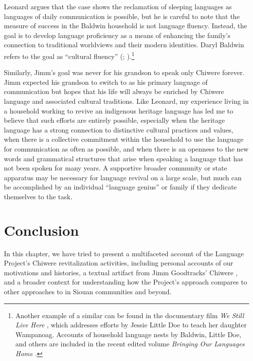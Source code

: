 \documentclass[output=paper]{LSP/langsci}
\begin{document}
\largerpage
Leonard argues that the  case shows the reclamation of sleeping languages as languages of daily communication is possible, but he is careful to note that the measure of success in the Baldwin household is not  language fluency. Instead, the goal is to develop language proficiency as a means of enhancing the family's connection to traditional worldviews and their modern  identities. Daryl Baldwin refers to the goal as ``cultural fluency'' (\citealt[36--37]{Leonard2007}; \citeyear[139--140]{Leonard2011}).\footnote{Another example of a similar  can be found in the documentary film \emph{We Still Live Here} \citep{Makepeace2011}, which addresses efforts by Jessie Little Doe to teach her daughter Wampanoag. Accounts of household language nests by Baldwin, Little Doe, and others are included in the recent edited volume \emph{Bringing Our Languages Home} \citep{Hinton2013}.} 

Similarly, Jimm's goal was never for his grandson to speak only Chiwere forever. Jimm expected his grandson to switch to  as his primary language of communication but hopes that his life will always be enriched by Chiwere language and associated cultural traditions. Like Leonard, my experience living in a household working to revive an indigenous heritage language has led me to believe that such efforts are entirely possible, especially when the heritage language has a strong connection to distinctive cultural practices and values, when there is a collective commitment within the household to use the language for communication as often as possible, and when there is an openness to the new words and grammatical structures that arise when speaking a language that has not been spoken for many years. A supportive broader community or state apparatus may be necessary for language revival on a large scale, but much can be accomplished by an individual ``language genius'' or family if they dedicate themselves to the task.

\section{Conclusion}
In this chapter, we have tried to present a multifaceted account of the  Language Project's Chiwere revitalization activities, including personal accounts of our motivations and histories, a textual artifact from Jimm Goodtracks' Chiwere , and a broader context for understanding how the Project's approach compares to other approaches to  in Siouan communities and beyond.
\end{document}
